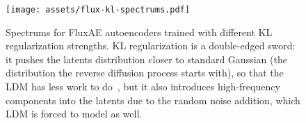 \begin{figure}[t]
\centering
\texttt{[image: assets/flux-kl-spectrums.pdf]}
\caption{Spectrums for FluxAE autoencoders trained with different KL regularization strengths. KL regularization is a double-edged sword: it pushes the latents distribution closer to standard Gaussian (the distribution the reverse diffusion process starts with), so that the LDM has less work to do~\cite{LSGM}, but it also introduces high-frequency components into the latents due to the random noise addition, which LDM is forced to model as well.}
\label{fig:flux-kl-spectrums}
\end{figure}
